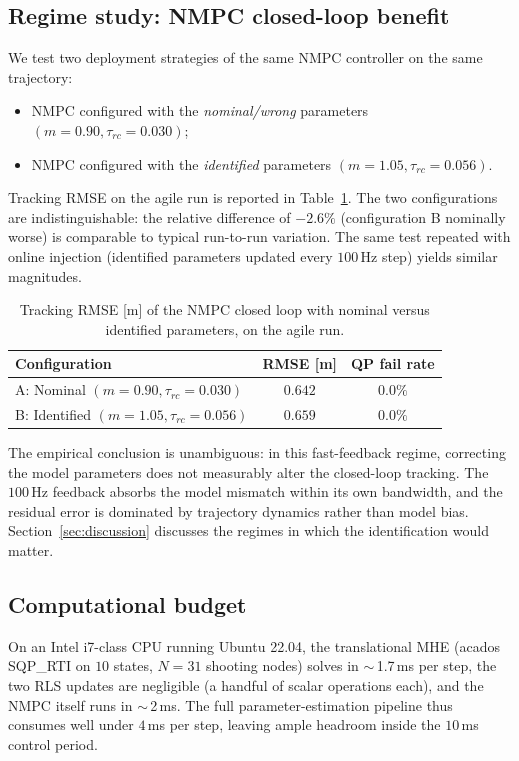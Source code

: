 \documentclass[lettersize,journal]{IEEEtran}
\begin{document}
\subsection{Regime study: NMPC closed-loop benefit}
We test two deployment strategies of the same NMPC controller on
the same trajectory:
\begin{itemize}
\item[\textbf{A:}] NMPC configured with the \emph{nominal/wrong}
parameters $(m=0.90,\tau_{rc}=0.030)$;
\item[\textbf{B:}] NMPC configured with the \emph{identified}
parameters $(m=1.05,\tau_{rc}=0.056)$.
\end{itemize}
Tracking RMSE on the agile run is reported in
Table~\ref{tab:nmpc}.  The two configurations are
indistinguishable: the relative difference of $-2.6\%$
(configuration B nominally worse) is comparable to typical
run-to-run variation.  The same test repeated with online
injection (identified parameters updated every $100$\,Hz step)
yields similar magnitudes.

\begin{table}[t]
\centering
\caption{Tracking RMSE [m] of the NMPC closed loop with nominal
versus identified parameters, on the agile run.}
\label{tab:nmpc}
\begin{tabular}{lcc}
\toprule
Configuration & RMSE [m] & QP fail rate \\
\midrule
A: Nominal $(m=0.90,\tau_{rc}=0.030)$    & $0.642$ & $0.0\%$ \\
B: Identified $(m=1.05,\tau_{rc}=0.056)$ & $0.659$ & $0.0\%$ \\
\bottomrule
\end{tabular}
\end{table}

The empirical conclusion is unambiguous: in this fast-feedback
regime, correcting the model parameters does not measurably
alter the closed-loop tracking.  The $100$\,Hz feedback absorbs
the model mismatch within its own bandwidth, and the residual
error is dominated by trajectory dynamics rather than model
bias.  Section~\ref{sec:discussion} discusses the regimes in
which the identification would matter.

\subsection{Computational budget}\label{sec:budget}
On an Intel i7-class CPU running Ubuntu 22.04, the translational
MHE (acados SQP\_RTI on $10$ states, $N=31$ shooting nodes)
solves in $\sim$\,1.7\,ms per step, the two RLS updates are
negligible (a handful of scalar operations each), and the NMPC
itself runs in $\sim$\,2\,ms.  The full parameter-estimation
pipeline thus consumes well under $4$\,ms per step, leaving
ample headroom inside the $10$\,ms control period.
\end{document}
